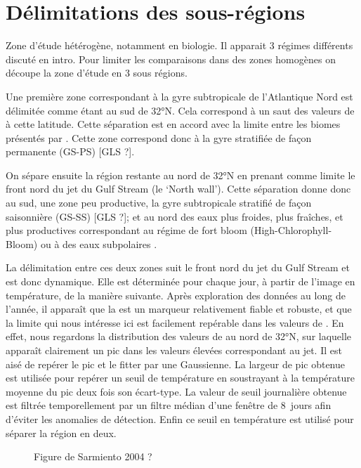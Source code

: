 \documentclass[index]{subfiles}
\begin{document}
\section{Délimitations des sous-régions}
\label{sec:delimitations-regions}

Zone d'étude hétérogène, notamment en biologie.
Il apparait 3 régimes différents discuté en intro.
Pour limiter les comparaisons dans des zones homogènes on découpe la zone d'étude en 3 sous régions.

Une première zone correspondant à la gyre subtropicale de l'Atlantique Nord est délimitée comme étant au sud de \ang{32}N.
Cela correspond à un saut des valeurs de  à cette latitude.
Cette séparation est en accord avec la limite entre les biomes présentés par \textcite{sarmiento_2004}.
Cette zone correspond donc à la gyre stratifiée de façon permanente (GS-PS) [GLS ?].

On sépare ensuite la région restante au nord de 32°N en prenant comme limite le front nord du jet du Gulf Stream (le `North wall'). Cette séparation donne donc au sud, une zone peu productive, la gyre subtropicale stratifié de façon saisonnière (GS-SS) [GLS ?]; et au nord des eaux plus froides, plus fraîches, et plus productives correspondant au régime de fort bloom (High-Chlorophyll-Bloom)  ou à des eaux subpolaires .

La délimitation entre ces deux zones suit le front nord du jet du Gulf Stream et est donc dynamique. Elle est déterminée pour chaque jour, à partir de l'image en température, de la manière suivante.
Après exploration des données au long de l'année, il apparaît que la  est un marqueur relativement fiable et robuste, et que la limite qui nous intéresse ici est facilement repérable dans les valeurs de .
En effet, nous regardons la distribution des valeurs de  au nord de 32°N, sur laquelle apparaît clairement un pic dans les valeurs élevées correspondant au jet.
Il est aisé de repérer le pic et le fitter par une Gaussienne. La largeur de pic obtenue est utilisée pour repérer un seuil de température en soustrayant à la température moyenne du pic deux fois son écart-type.
La valeur de seuil journalière obtenue est filtrée temporellement par un filtre médian d'une fenêtre de 8~jours afin d'éviter les anomalies de détection.
Enfin ce seuil en température est utilisé pour séparer la région en deux.

\begin{figure}
  \caption{Figure de Sarmiento 2004 ?}
  \label{fig:sarmiento}
\end{figure}
\end{document}
